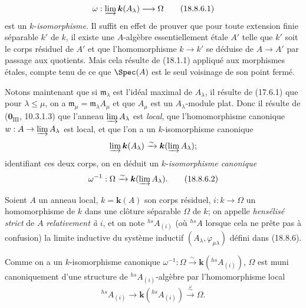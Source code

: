 \begin{env}[18.8.6]
\begin{equation}
  \omega:\varinjlim\boldsymbol{k}(A_\lambda)\longrightarrow\Omega
  \label{IV.18.8.6.1}
  \tag{18.8.6.1}
\end{equation}
est un $k$-\emph{isomorphisme}. Il suffit en effet de prouver que pour toute extension finie séparable $k'$ de $k$, il existe une $A$-algèbre essentiellement étale $A'$ telle que $k'$ soit le corps résiduel de $A'$ et que l'homomorphisme $k\to k'$ se déduise de $A\to A'$ par passage aux quotients. Mais cela résulte de (18.1.1) appliqué aux morphismes étales, compte tenu de ce que $\Spec(A)$ est le seul voisinage de son point fermé.

Notons maintenant que si $\mathfrak m_\lambda$ est l'idéal maximal de $A_\lambda$, il résulte de (17.6.1) que pour $\lambda\leq\mu$, on a $\mathfrak m_\mu=\mathfrak m_\lambda A_\mu$ et que $A_\mu$ est un $A_\lambda$-module plat. Donc il résulte de ($\mathbf{0}_{\mathrm{III}}$, 10.3.1.3) que l'anneau $\varinjlim A_\lambda$ est \emph{local}, que l'homomorphisme canonique $w:A\to\varinjlim A_\lambda$ est local, et que l'on a un $k$-isomorphisme canonique
\[
  \varinjlim\boldsymbol{k}(A_\lambda)\xrightarrow{\sim}\boldsymbol{k}(\varinjlim A_\lambda);
\]
identifiant ces deux corps, on en déduit un $k$-\emph{isomorphisme canonique}
\begin{equation}
  \omega^{-1}:\Omega\xrightarrow{\sim}\boldsymbol{k}(\varinjlim A_\lambda).
  \label{IV.18.8.6.2}
  \tag{18.8.6.2}
\end{equation}
\end{env}

\begin{definition}[18.8.7]
Soient $A$ un anneau local, $k=\boldsymbol{k}(A)$ son corps résiduel, $i:k\to\Omega$ un homomorphisme de $k$ dans une clôture séparable $\Omega$ de $k$; on appelle \emph{hensélisé strict} de $A$ \emph{relativement à} $i$, et on note ${}^{hs}\!A_{(i)}$ (où ${}^{hs}\!A$ lorsque cela ne prête pas à confusion) la limite inductive du système inductif $(A_\lambda,\varphi_{\mu\lambda})$ défini dans \textup{(18.8.6)}.
\end{definition}

Comme on a un $k$-isomorphisme canonique $\omega^{-1}:\Omega\xrightarrow{\sim}\boldsymbol{k}({}^{hs}\!A_{(i)})$, $\Omega$ est muni canoniquement d'une structure de ${}^{hs}\!A_{(i)}$-algèbre par l'homomorphisme local
\[
  {}^{hs}\!A_{(i)}\longrightarrow\boldsymbol{k}({}^{hs}\!A_{(i)})\xrightarrow{\overset{\omega}{\sim}}\Omega.
\]

